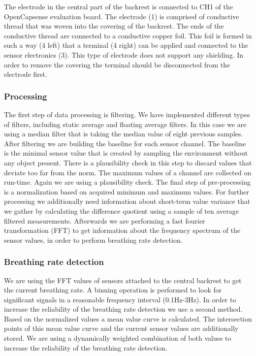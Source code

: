 The electrode in the central part of the backrest is connected to CH1 of the OpenCapsense evaluation board.
The electrode (1) is comprised of conductive thread that was woven into the covering of the backrest. The ends of the conductive thread are connected to a conductive copper foil. This foil is formed in such a way (4 left) that a terminal (4 right) can be applied and connected to the sensor electronics (3). This type of electrode does not support any shielding. In order to remove the covering the terminal should be disconnected from the electrode first.
 
\subsubsection{Processing}
The first step of data processing is filtering. We have implemented different types of filters, including static average and floating average filters. In this case we are using a median filter that is taking the median value of eight previous samples. After filtering we are building the baseline for each sensor channel. The baseline is the minimal sensor value that is created by sampling the environment without any object present. There is a plausibility check in this step to discard values that deviate too far from the norm. The maximum values of a channel are collected on run-time. Again we are using a plausibility check. The final step of pre-processing is a normalization based on acquired minimum and maximum values. For further processing we additionally need information about short-term value variance that we gather by calculating the difference quotient using a sample of ten average filtered measurements.
Afterwards we are performing a fast fourier transformation (FFT) to get information about the frequency spectrum of the sensor values, in order to perform breathing rate detection. 
\subsubsection*{Breathing rate detection} 
We are using the FFT values of sensors attached to the central backrest to get the current breathing rate. A binning operation is performed to look for significant signals in a reasonable frequency interval (0.1Hz-3Hz).
In order to increase the reliability of the breathing rate detection we use a second method. Based on the normalized values a mean value curve is calculated. The intersection points of this mean value curve and the current sensor values are additionally stored. We are using a dynamically weighted combination of both values to increase the reliability of the breathing rate detection.

